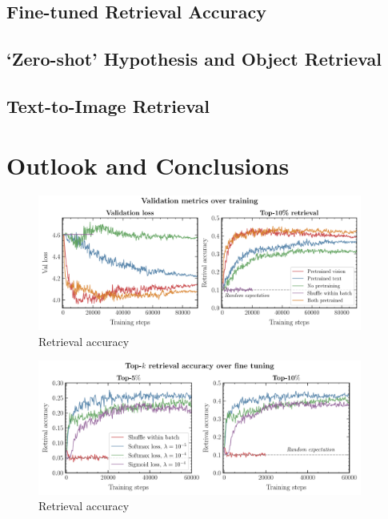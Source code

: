 \documentclass[10pt]{article} %
\begin{document}

\subsection{Fine-tuned Retrieval Accuracy}
\label{sec:retrieval_acc}

\subsection{`Zero-shot' Hypothesis and Object Retrieval}
\label{sec:zero_shot}

\subsection{Text-to-Image Retrieval}
\label{sec:tti}

\section{Outlook and Conclusions}
\label{sec:conclusion}



  

\begin{figure}[!h]
      \includegraphics[width=0.95\textwidth]{plots/val_metrics.pdf}
      \caption{Retrieval accuracy}
      \label{fig:retrieval_acc}
      \end{figure}
      

\begin{figure}[!h]
\includegraphics[width=0.95\textwidth]{plots/retrieval_acc.pdf}
\caption{Retrieval accuracy}
\label{fig:retrieval_acc}
\end{figure}
\end{document}
